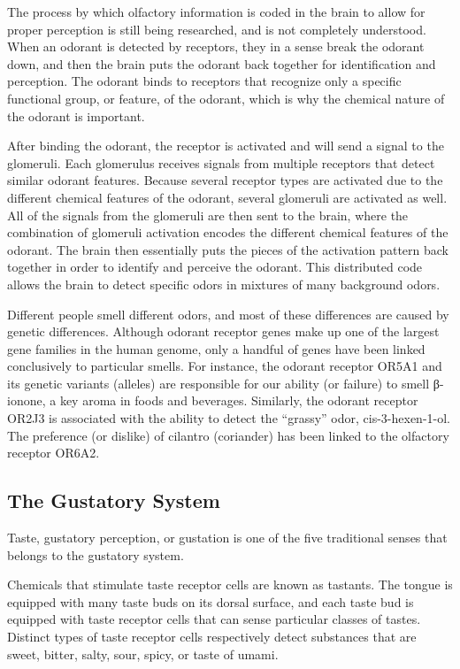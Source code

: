 The process by which olfactory information is coded in the brain to
allow for proper perception is still being researched, and is not
completely understood. When an odorant is detected by receptors, they in
a sense break the odorant down, and then the brain puts the odorant back
together for identification and perception. The odorant binds to
receptors that recognize only a specific functional group, or feature,
of the odorant, which is why the chemical nature of the odorant is
important.

After binding the odorant, the receptor is activated and will send a
signal to the glomeruli. Each glomerulus receives signals from multiple
receptors that detect similar odorant features. Because several receptor
types are activated due to the different chemical features of the
odorant, several glomeruli are activated as well. All of the signals
from the glomeruli are then sent to the brain, where the combination of
glomeruli activation encodes the different chemical features of the
odorant. The brain then essentially puts the pieces of the activation
pattern back together in order to identify and perceive the odorant.
This distributed code allows the brain to detect specific odors in
mixtures of many background odors.

Different people smell different odors, and most of these differences
are caused by genetic differences. Although odorant receptor genes make
up one of the largest gene families in the human genome, only a handful
of genes have been linked conclusively to particular smells. For
instance, the odorant receptor OR5A1 and its genetic variants (alleles)
are responsible for our ability (or failure) to smell β-ionone, a key
aroma in foods and beverages. Similarly, the odorant receptor OR2J3 is
associated with the ability to detect the ``grassy'' odor,
cis-3-hexen-1-ol. The preference (or dislike) of cilantro (coriander)
has been linked to the olfactory receptor OR6A2.

\hypertarget{the-gustatory-system}{%
\subsection{The Gustatory System}\label{the-gustatory-system}}

Taste, gustatory perception, or gustation is one of the five traditional
senses that belongs to the gustatory system.

Chemicals that stimulate taste receptor cells are known as tastants. The
tongue is equipped with many taste buds on its dorsal surface, and each
taste bud is equipped with taste receptor cells that can sense
particular classes of tastes. Distinct types of taste receptor cells
respectively detect substances that are sweet, bitter, salty, sour,
spicy, or taste of umami.


